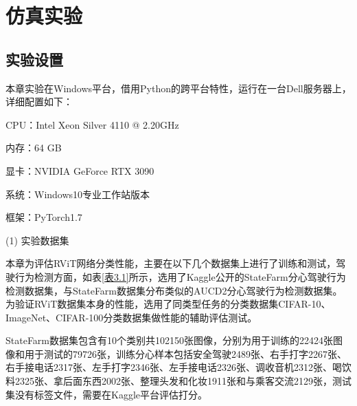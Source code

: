 \section{仿真实验}

\subsection{实验设置}

本章实验在Windows平台，借用Python的跨平台特性，运行在一台Dell服务器上，详细配置如下：

CPU：Intel Xeon Silver 4110 @ 2.20GHz

内存：64 GB

显卡：NVIDIA GeForce RTX 3090

系统：Windows10专业工作站版本

框架：PyTorch1.7

(1)	实验数据集

本章为评估RViT网络分类性能，主要在以下几个数据集上进行了训练和测试，驾驶行为检测方面，如表\ref{表3.1}所示，选用了Kaggle公开的StateFarm分心驾驶行为检测数据集，与StateFarm数据集分布类似的AUCD2分心驾驶行为检测数据集。为验证RViT数据集本身的性能，选用了同类型任务的分类数据集CIFAR-10、ImageNet、CIFAR-100分类数据集做性能的辅助评估测试。

StateFarm数据集包含有10个类别共102150张图像，分别为用于训练的22424张图像和用于测试的79726张，训练分心样本包括安全驾驶2489张、右手打字2267张、右手接电话2317张、左手打字2346张、左手接电话2326张、调收音机2312张、喝饮料2325张、拿后面东西2002张、整理头发和化妆1911张和与乘客交流2129张，测试集没有标签文件，需要在Kaggle平台评估打分。


